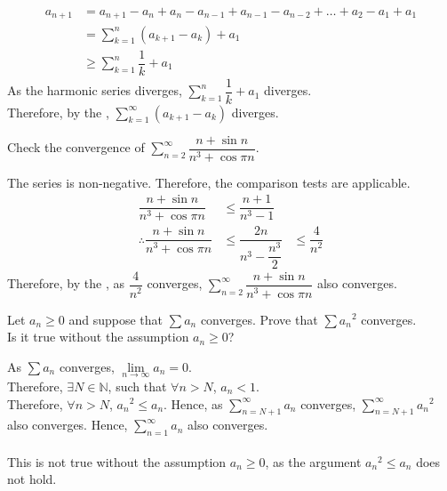 \documentclass[fleqn, a4paper, 12pt, twoside]{article}
\theoremstyle{definition}
\theoremstyle{theorem}
\begin{document}
\begin{solution}
	\begin{align*}
		a_{n + 1} &= a_{n + 1} - a_{n} + a_{n} - a_{n - 1} + a_{n - 1} - a_{n - 2} + \dots + a_{2} - a_{1} + a_{1}\\
		&= \sum_{k = 1}^{n} \left( a_{k + 1} - a_{k} \right) + a_{1}\\
		&\ge \sum_{k = 1}^{n} \dfrac{1}{k} + a_1
	\end{align*}
	As the harmonic series diverges, $\sum\limits_{k = 1}^{n} \dfrac{1}{k} + a_1$ diverges.\\
	Therefore, by the , $\sum\limits_{k = 1}^{\infty} (a_{k + 1} - a_k)$ diverges.
\end{solution}

\begin{question}
	Check the convergence of $\sum\limits_{n = 2}^{\infty} \dfrac{n + \sin n}{n^3 + \cos \pi n}$.
\end{question}

\begin{solution}
	The series is non-negative.
	Therefore, the comparison tests are applicable.
	\begin{align*}
		\dfrac{n + \sin n}{n^3 + \cos \pi n} &\le \dfrac{n + 1}{n^3 - 1}\\
		\therefore \dfrac{n + \sin n}{n^3 + \cos \pi n} &\le \dfrac{2n}{n^3 - \dfrac{n^3}{2}} &\le \dfrac{4}{n^2}
	\end{align*}
	Therefore, by the , as $\dfrac{4}{n^2}$ converges, $\sum_{n = 2}^{\infty} \dfrac{n + \sin n}{n^3 + \cos \pi n}$ also converges.
\end{solution}

\begin{question}
	Let $a_n \ge 0$ and suppose that $\sum a_n$ converges. Prove that $\sum {a_n}^2$ converges.\\
	Is it true without the assumption $a_n \ge 0$?
\end{question}

\begin{solution}
	As $\sum a_n$ converges, $\lim\limits_{n \to \infty} a_n = 0$.\\
	Therefore, $\exists N \in \mathbb{N}$, such that $\forall n > N$, $a_n < 1$.\\
	Therefore, $\forall n > N$, ${a_n}^2 \le a_n$.
	Hence, as $\sum\limits_{n = N + 1}^{\infty} a_n$ converges, $\sum\limits_{n = N + 1}^{\infty} {a_n}^2$ also converges.
	Hence, $\sum\limits_{n = 1}^{\infty} a_n$ also converges.\\
	~\\
	This is not true without the assumption $a_n \ge 0$, as the argument ${a_n}^2 \le a_n$ does not hold.
\end{solution}
\end{document}
